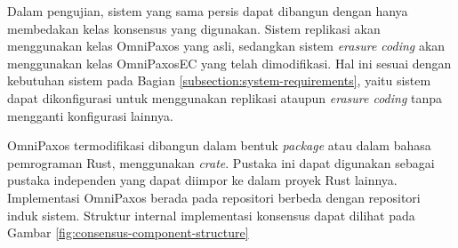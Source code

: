 Dalam pengujian, sistem yang sama persis dapat dibangun dengan hanya membedakan kelas konsensus yang digunakan. Sistem replikasi akan menggunakan kelas OmniPaxos yang asli, sedangkan sistem \textit{erasure coding} akan menggunakan kelas OmniPaxosEC yang telah dimodifikasi. Hal ini sesuai dengan kebutuhan sistem pada Bagian \ref{subsection:system-requirements}, yaitu sistem dapat dikonfigurasi untuk menggunakan replikasi ataupun \textit{erasure coding} tanpa mengganti konfigurasi lainnya.

OmniPaxos termodifikasi dibangun dalam bentuk \textit{package} atau dalam bahasa pemrograman Rust, menggunakan \textit{crate}. Pustaka ini dapat digunakan sebagai pustaka independen yang dapat diimpor ke dalam proyek Rust lainnya. Implementasi OmniPaxos berada pada repositori berbeda dengan repositori induk sistem. Struktur internal implementasi konsensus dapat dilihat pada Gambar \ref{fig:consensus-component-structure}
